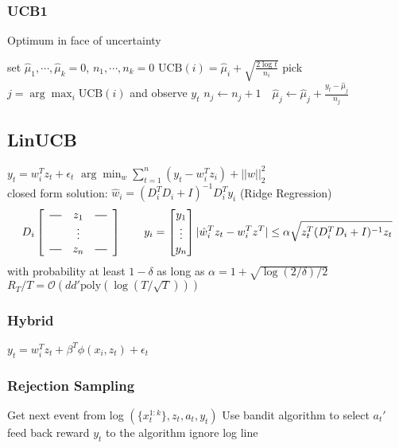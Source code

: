 \documentclass[10pt,parskip]{scrartcl}
\newcommand*{\horzbar}{\rule[.5ex]{2.5ex}{0.5pt}}
\begin{document}
\begin{multicols*}{3}
\subsubsection{UCB1} %
\label{ssub:ucb1}
Optimum in face of uncertainty
\begin{algorithmic}
	\State set $\hat{\mu}_1,\cdots,\hat{\mu}_k=0$, $n_1,\cdots,n_k=0$
		\State $\mathrm{UCB}(i) = \hat{\mu}_i + \sqrt{\frac{2 \log t}{n_i}}$
		\State pick $j = \arg\max_i \mathrm{UCB}(i)$ and observe $y_t$
		\State $n_j \gets n_j + 1 \quad \hat{\mu}_j \gets \hat{\mu}_j + \frac{y_t-\hat{\mu}_j}{n_j}$
	\EndFor
\end{algorithmic}
\subsection{LinUCB} %
\label{sub:linucb}
$y_t = w_i^T z_t + \epsilon_t$ \qquad $\arg\min_{w}\sum_{t=1}^n(y_t-w_i^Tz_i) + ||w||_2^2$ \\
closed form solution: $\hat{w}_i = (D_i^T D_i + I)^{-1}D_i^Ty_i$ (Ridge Regression)
$$
D_i \left[ \begin{array}{c c c}
\horzbar & z_1 & \horzbar \\ 
& \vdots & \\ 
\horzbar & z_n & \horzbar
\end{array}
\right]
	\qquad y_i = \begin{bmatrix}
		y_1 \\ 
		\vdots \\
		y_n
	\end{bmatrix} \\
|\hat{w}_i^T z_t - w_i^T z^T| \leq \alpha \sqrt{z_t^T(D_i^TD_i+I)^{-1}z_t}
$$
with probability at least $1-\delta$ as long as $\alpha = 1 + \sqrt{\log(2/\delta)/2}$ \\
$R_T/T = \mathcal{O}(dd' \mathrm{poly}(\log(T/\sqrt{T})))$
\subsubsection{Hybrid} %
\label{ssub:hybrid}
$y_t = w_i^T z_t + \beta^T \phi(x_i,z_t) + \epsilon_t$

\subsubsection{Rejection Sampling} %
\label{ssub:rejection_sampling}
\begin{algorithmic}
		\State Get next event from log $(\{x_t^{1:k}\},z_t,a_t,y_t)$
		\State Use bandit algorithm to select $a_t'$
			\State feed back reward $y_t$ to the algorithm
		\Else
			\State ignore log line
		\EndIf
	\EndFor
\end{algorithmic}


\end{multicols*}
\end{document}
